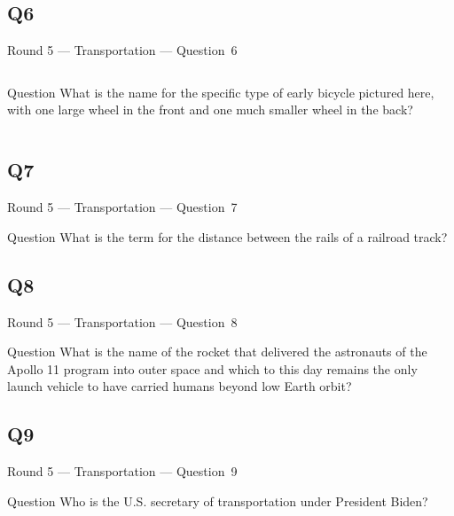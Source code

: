 \documentclass[11pt]{beamer}
\begin{document}
\subsection*{Q6}
\begin{frame}[t]{Round 5 --- Transportation --- \mbox{Question 6}}
\vspace{-0.5em}
\begin{columns}[T,totalwidth=\linewidth]
\begin{column}{0.32\linewidth}
\begin{block}{Question}
What is the name for the specific type of early bicycle pictured here, with one large wheel in the front and one much smaller wheel in the back?
\end{block}
\end{column}
\begin{column}{0.65\linewidth}
\begin{center}
\texttt{[image: \{Images/pennyfarthing]}.jpg}
\end{center}
\end{column}
\end{columns}
\end{frame}
\subsection*{Q7}
\begin{frame}[t]{Round 5 --- Transportation --- \mbox{Question 7}}
\vspace{-0.5em}
\begin{block}{Question}
What is the term for the distance between the rails of a railroad track?
\end{block}
\end{frame}
\subsection*{Q8}
\begin{frame}[t]{Round 5 --- Transportation --- \mbox{Question 8}}
\vspace{-0.5em}
\begin{block}{Question}
What is the name of the rocket that delivered the astronauts of the Apollo 11 program into outer space and which to this day remains the only launch vehicle to have carried humans beyond low Earth orbit?
\end{block}
\end{frame}
\subsection*{Q9}
\begin{frame}[t]{Round 5 --- Transportation --- \mbox{Question 9}}
\vspace{-0.5em}
\begin{block}{Question}
Who is the U.S. secretary of transportation under President Biden?
\end{block}
\end{frame}
\end{document}
